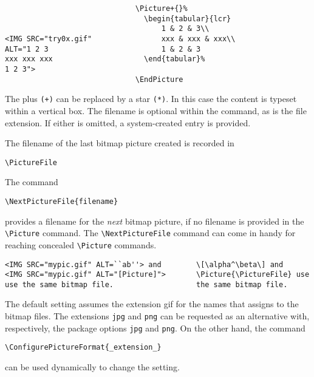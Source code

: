 
\begin{verbatim}
                              \Picture+{}% 
                                \begin{tabular}{lcr} 
                                    1 & 2 & 3\\ 
<IMG SRC="try0x.gif"                xxx & xxx & xxx\\ 
ALT="1 2 3                          1 & 2 & 3 
xxx xxx xxx                     \end{tabular}% 
1 2 3"> 
                              \EndPicture 
\end{verbatim}

The plus \verb|(+)| can be replaced by a star \verb|(*)|. In this case the content is typeset 
within a vertical box. The filename is optional within the command, as is the file 
extension. If either is omitted, a system-created entry is provided. 

The filename of the last bitmap picture created is recorded in 

\begin{verbatim}
\PictureFile 
\end{verbatim}

The command 

\begin{verbatim}
\NextPictureFile{filename} 
\end{verbatim}

provides a filename for the \emph{next} bitmap picture, if no filename is provided in the 
\verb|\Picture| command. The \verb|\NextPictureFile| command can come in handy for 
reaching concealed \verb|\Picture| commands. 

\begin{verbatim}
<IMG SRC="mypic.gif" ALT=``ab''> and        \[\alpha^\beta\] and 
<IMG SRC="mypic.gif" ALT="[Picture]">       \Picture{\PictureFile} use 
use the same bitmap file.                   the same bitmap file. 
\end{verbatim}

The default setting assumes the extension gif for the names that \texht
assigns to the bitmap files. The extensions \verb|jpg| and
\verb|png| can be requested
as an alternative with, respectively, the package options
\verb|jpg| and \verb|png|. On the other hand, the 
command 

\begin{verbatim}
\ConfigurePictureFormat{_extension_} 
\end{verbatim}

can be used dynamically to change the setting. 
